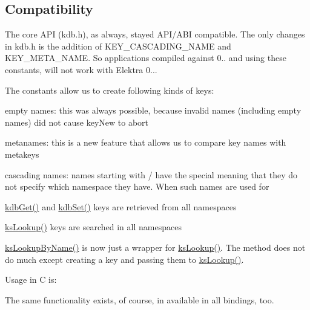 \subsection*{Compatibility}

The core A\+PI (kdb.\+h), as always, stayed A\+P\+I/\+A\+BI compatible. The only changes in kdb.\+h is the addition of {\ttfamily K\+E\+Y\+\_\+\+C\+A\+S\+C\+A\+D\+I\+N\+G\+\_\+\+N\+A\+ME} and {\ttfamily K\+E\+Y\+\_\+\+M\+E\+T\+A\+\_\+\+N\+A\+ME}. So applications compiled against 0.. and using these constants, will not work with Elektra 0...

The constants allow us to create following kinds of keys\+:


\begin{DoxyItemize}
\item empty names\+: this was always possible, because invalid names (including empty names) did not cause key\+New to abort
\item metanames\+: this is a new feature that allows us to compare key names with metakeys
\item cascading names\+: names starting with / have the special meaning that they do not specify which namespace they have. When such names are used for
\begin{DoxyItemize}
\item \hyperlink{group__kdb_ga28e385fd9cb7ccfe0b2f1ed2f62453a1}{kdb\+Get()} and \hyperlink{group__kdb_ga11436b058408f83d303ca5e996832bcf}{kdb\+Set()} keys are retrieved from all namespaces
\item \hyperlink{group__keyset_gaa34fc43a081e6b01e4120daa6c112004}{ks\+Lookup()} keys are searched in all namespaces
\item \hyperlink{group__keyset_gad2e30fb6d4739d917c5abb2ac2f9c1a1}{ks\+Lookup\+By\+Name()} is now just a wrapper for \hyperlink{group__keyset_gaa34fc43a081e6b01e4120daa6c112004}{ks\+Lookup()}. The method does not do much except creating a key and passing them to \hyperlink{group__keyset_gaa34fc43a081e6b01e4120daa6c112004}{ks\+Lookup()}.
\end{DoxyItemize}
\end{DoxyItemize}

Usage in C is\+: 


The same functionality exists, of course, in available in all bindings, too.

